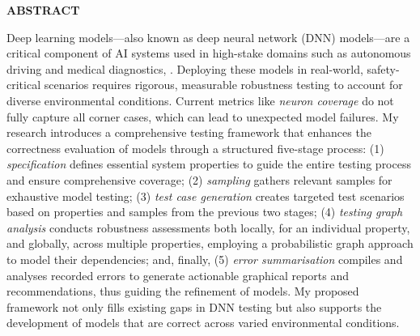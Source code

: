 
\begin{center}
{\fontsize{16}{15} \bf ABSTRACT}
\vspace{0.4cm}
\end{center}
\normalsize

Deep learning 
models---also known as deep neural network (DNN) models---are 
a critical component of AI systems 
used in high-stake domains 
such as 
autonomous driving and
medical diagnostics, .
Deploying these models in real-world, safety-critical 
scenarios requires rigorous, measurable robustness 
testing to account for 
diverse environmental conditions.
Current metrics like \emph{neuron coverage}
do not fully capture all corner cases, 
which can lead to unexpected model failures. 
My research introduces 
a comprehensive testing framework that enhances 
the correctness evaluation of models through a 
structured five-stage process:
(1) \emph{specification} defines 
essential system properties to guide the entire testing process 
and ensure comprehensive coverage;
(2) \emph{sampling}
gathers relevant samples 
for exhaustive model testing;
(3) \emph{test case generation} 
creates targeted test scenarios
based on properties and 
samples from the previous two stages; 
(4) \emph{testing graph analysis}  
conducts robustness assessments 
both locally, for an individual property,
and globally, across multiple properties, 
employing a probabilistic graph approach
to model their dependencies;
and, finally, (5) \emph{error summarisation} 
compiles and analyses 
recorded errors to generate 
actionable graphical 
reports and recommendations, 
thus guiding the refinement of models. 
My proposed framework
 not only fills existing gaps in DNN testing but 
also supports the development of models that are correct 
across varied environmental conditions.

\clearpage

